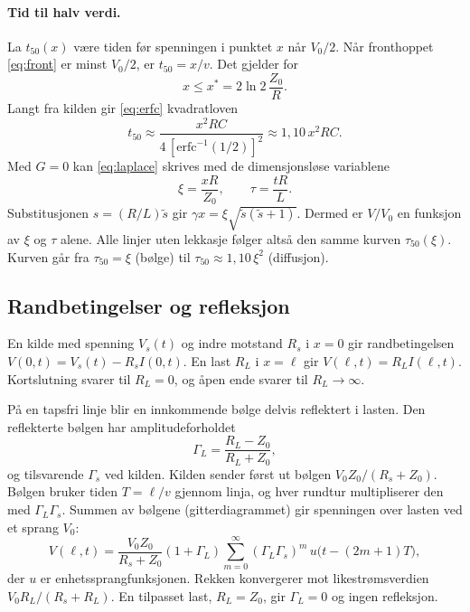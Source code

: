 \documentclass[11pt,a4paper]{article}
\numberwithin{equation}{section}
\numberwithin{figure}{section}
\numberwithin{table}{section}
\begin{document}
\paragraph{Tid til halv verdi.}
La $t_{50}(x)$ være tiden før spenningen i punktet $x$ når $V_0/2$. Når
fronthoppet \eqref{eq:front} er minst $V_0/2$, er $t_{50} = x/v$. Det gjelder for
\begin{equation}
  x \le x^* = 2\ln 2\,\frac{Z_0}{R}. \label{eq:xstjerne}
\end{equation}
Langt fra kilden gir \eqref{eq:erfc} kvadratloven
\begin{equation}
  t_{50} \approx \frac{x^2RC}{4\,[\mathrm{erfc}^{-1}(1/2)]^2} \approx 1{,}10\,x^2RC. \label{eq:kvadratlov}
\end{equation}
Med $G = 0$ kan \eqref{eq:laplace} skrives med de dimensjonsløse variablene
\begin{equation}
  \xi = \frac{xR}{Z_0}, \qquad \tau = \frac{tR}{L}. \label{eq:skalering}
\end{equation}
Substitusjonen $s = (R/L)\tilde s$ gir $\gamma x = \xi\sqrt{\tilde s(\tilde s + 1)}$.
Dermed er $V/V_0$ en funksjon av $\xi$ og $\tau$ alene. Alle linjer uten
lekkasje følger altså den samme kurven $\tau_{50}(\xi)$. Kurven går fra
$\tau_{50} = \xi$ (bølge) til $\tau_{50} \approx 1{,}10\,\xi^2$ (diffusjon).

\subsection{Randbetingelser og refleksjon}\label{sec:refleksjon}
En kilde med spenning $V_s(t)$ og indre motstand $R_s$ i $x = 0$ gir
randbetingelsen $V(0,t) = V_s(t) - R_sI(0,t)$. En last $R_L$ i $x = \ell$ gir
$V(\ell,t) = R_LI(\ell,t)$. Kortslutning svarer til $R_L = 0$, og åpen ende
svarer til $R_L \to \infty$.

På en tapsfri linje blir en innkommende bølge delvis reflektert i lasten. Den
reflekterte bølgen har amplitudeforholdet \cite{pozar2012}
\begin{equation}
  \Gamma_L = \frac{R_L - Z_0}{R_L + Z_0}, \label{eq:Gamma}
\end{equation}
og tilsvarende $\Gamma_s$ ved kilden. Kilden sender først ut bølgen
$V_0Z_0/(R_s + Z_0)$. Bølgen bruker tiden $T = \ell/v$ gjennom linja, og hver
rundtur multipliserer den med $\Gamma_L\Gamma_s$. Summen av bølgene
(gitterdiagrammet) gir spenningen over lasten ved et sprang $V_0$:
\begin{equation}
  V(\ell,t) = \frac{V_0Z_0}{R_s + Z_0}(1 + \Gamma_L)\sum_{m=0}^{\infty}(\Gamma_L\Gamma_s)^m
  \,u\big(t - (2m+1)T\big), \label{eq:gitter}
\end{equation}
der $u$ er enhetssprangfunksjonen. Rekken konvergerer mot
likestrømsverdien $V_0R_L/(R_s + R_L)$. En tilpasset last, $R_L = Z_0$, gir
$\Gamma_L = 0$ og ingen refleksjon.
\end{document}
